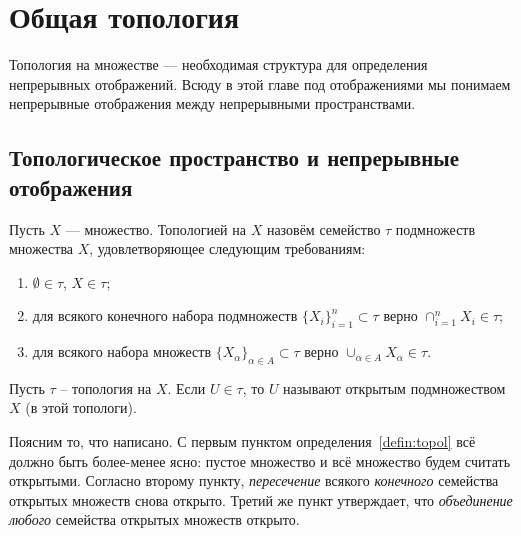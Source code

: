 \section{Общая топология}
Топология на множестве --- необходимая структура для определения непрерывных отображений. Всюду в этой главе под отображениями мы понимаем непрерывные отображения между непрерывными пространствами.

\subsection{Топологическое пространство и непрерывные отображения}
\begin{defin}\label{defin:topol}
	Пусть $X$ --- множество. Топологией на $X$ назовём семейство $\tau$ подмножеств множества $X$, удовлетворяющее следующим требованиям:
	\begin{enumerate}
		\item $\emptyset\in\tau$, $X\in\tau$;
		\item для всякого конечного набора подмножеств $\{X_i\}_{i=1}^n\subset\tau$ верно $\displaystyle\cap_{i=1}^n X_i\in\tau$;
		\item для всякого набора множеств $\{X_{\alpha}\}_{\alpha\in A}\subset\tau$ верно $\displaystyle\cup_{\alpha\in A} X_{\alpha}\in\tau$.
	\end{enumerate}
\end{defin}
\begin{defin}
	Пусть $\tau$ -- топология на $X$. Если $U\in\tau$, то $U$ называют открытым подмножеством $X$ (в этой топологи).
\end{defin}
Поясним то, что написано. С первым пунктом определения~\ref{defin:topol} всё должно быть более-менее ясно: пустое множество и всё множество будем считать открытыми. Согласно второму пункту, \textit{пересечение} всякого \textit{конечного} семейства открытых множеств снова открыто. Третий же пункт утверждает, что \textit{объединение} \textit{любого} семейства открытых множеств открыто.

